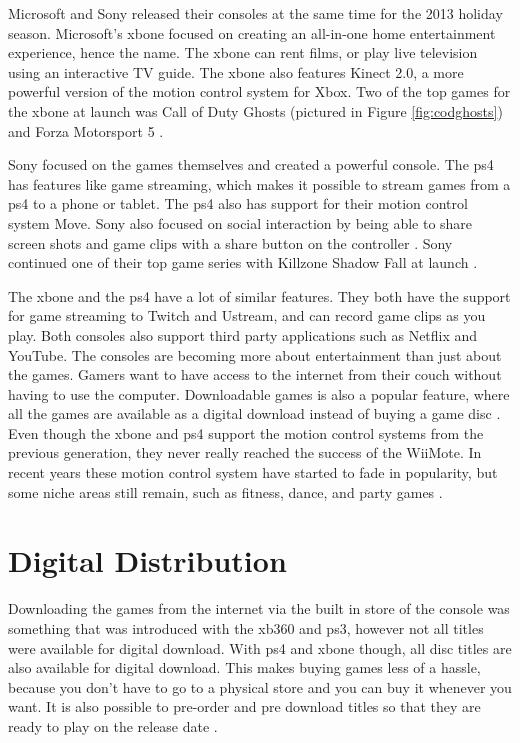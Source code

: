 
Microsoft and Sony released their consoles at the same time for the 2013 holiday season. Microsoft's \gls{xbone} focused on creating an all-in-one home entertainment experience, hence the name. The \gls{xbone} can rent films, or play live television using an interactive TV guide. The \gls{xbone} also features Kinect 2.0, a more powerful version of the motion control system for Xbox. Two of the top games for the \gls{xbone} at launch was Call of Duty Ghosts (pictured in Figure \ref{fig:codghosts}) and Forza Motorsport 5 \cite{2013independent}.

Sony focused on the games themselves and created a powerful console. The \gls{ps4} has features like game streaming, which makes it possible to stream games from a \gls{ps4} to a phone or tablet. The \gls{ps4} also has support for their motion control system Move. Sony also focused on social interaction by being able to share screen shots and game clips with a share button on the controller \cite{2013sony}. Sony continued one of their top game series with Killzone Shadow Fall at launch \cite{2013kotaku}.

The \gls{xbone} and the \gls{ps4} have a lot of similar features. They both have the support for game streaming to Twitch and Ustream, and can record game clips as you play. Both consoles also support third party applications such as Netflix and YouTube. The consoles are becoming more about entertainment than just about the games. Gamers want to have access to the internet from their couch without having to use the computer. Downloadable games is also a popular feature, where all the games are available as a digital download instead of buying a game disc \cite{2015ign}. Even though the \gls{xbone} and \gls{ps4} support the motion control systems from the previous generation, they never really reached the success of the WiiMote. In recent years these motion control system have started to fade in popularity, but some niche areas still remain, such as fitness, dance, and party games \cite{2015gameon, 2014hardcore, 2014sciencebeta}.


\section{Digital Distribution}
Downloading the games from the internet via the built in store of the console was something that was introduced with the \gls{xb360} and \gls{ps3}, however not all titles were available for digital download. With \gls{ps4} and \gls{xbone} though, all disc titles are also available for digital download. This makes buying games less of a hassle, because you don't have to go to a physical store and you can buy it whenever you want. It is also possible to pre-order and pre download titles so that they are ready to play on the release date \cite{2015msstore, 2015psstore}.

